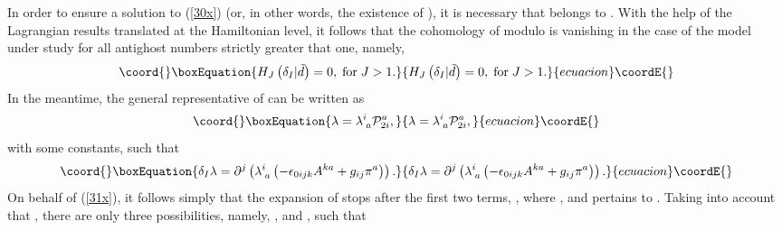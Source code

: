 \documentclass[a4paper,12pt]{article}
\begin{document}
In order to ensure a solution to (\ref{30x}) (or, in other words, the
existence of \coordHE{}), it is necessary
that \coordHE{} belongs to \coordHE{}. With
the help of the Lagrangian results \cite{31} translated at the Hamiltonian
level, it follows that the cohomology of \coordHE{} modulo \coordHE{} is
vanishing in the case of the model under study for all antighost numbers
strictly greater that one, namely, 
\begin{equation}\coord{}\boxEquation{
H_{J}\left( \delta _{I}|\tilde{d}\right) =0,\;\mathrm{for}\;J>1.  \label{31x}
}{
H_{J}\left( \delta _{I}|\tilde{d}\right) =0,\;\mathrm{for}\;J>1.  }{ecuacion}\coordE{}\end{equation}
In the meantime, the general representative of \coordHE{} can be written as 
\begin{equation}\coord{}\boxEquation{
\lambda =\lambda _{\;a}^{i}\mathcal{P}_{2i}^{a},  \label{32x}
}{
\lambda =\lambda _{\;a}^{i}\mathcal{P}_{2i}^{a},  }{ecuacion}\coordE{}\end{equation}
with \coordHE{} some constants, such that 
\begin{equation}\coord{}\boxEquation{
\delta _{I}\lambda =\partial ^{j}\left( \lambda _{\;a}^{i}\left( -\epsilon
_{0ijk}A^{ka}+g_{ij}\pi ^{a}\right) \right) .  \label{33x}
}{
\delta _{I}\lambda =\partial ^{j}\left( \lambda _{\;a}^{i}\left( -\epsilon
_{0ijk}A^{ka}+g_{ij}\pi ^{a}\right) \right) .  }{ecuacion}\coordE{}\end{equation}
On behalf of (\ref{31x}), it follows simply that the expansion of \coordHE{} stops after the first two terms, \coordHE{}, where \coordHE{}%
, and \coordHE{} pertains to \coordHE{}.
Taking into account that \coordHE{}, there are only three possibilities, namely, \coordHE{}, \coordHE{} and \coordHE{}, such that 
\end{document}
